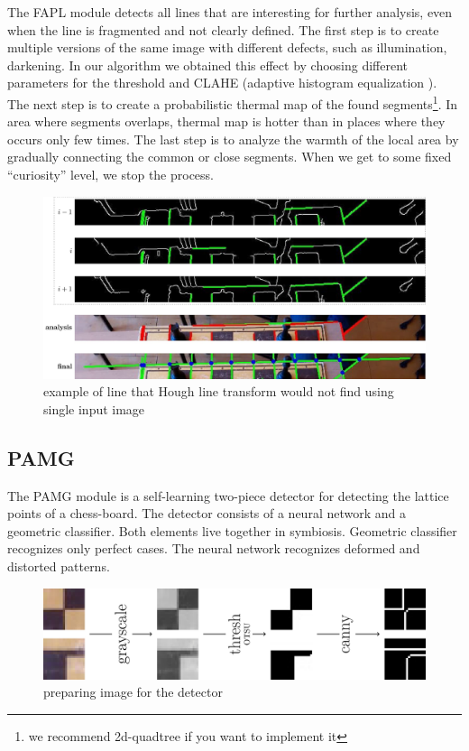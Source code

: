 \documentclass[letterpaper, 12pt]{article}
\begin{document}
The FAPL module detects all lines that are interesting for further analysis, even when the line is fragmented and not clearly defined.
The first step is to create multiple versions of the same image with different
defects, such as illumination, darkening.
In our algorithm we obtained this effect by choosing different parameters for
the threshold and CLAHE (adaptive histogram equalization
\cite{reza2004realization}).
The next step is to create a probabilistic thermal map of the found
segments\footnote{we recommend 2d-quadtree if you want to implement it}.
In area where segments overlaps, thermal map is hotter than in places where they occurs only few times.
The last step is to analyze the warmth of the local area by gradually connecting the common or close segments.
When we get to some fixed ``curiosity'' level, we stop the process.

\begin{figure}[H]
\centering
\includegraphics[width=\columnwidth]{figure5}
\caption{example of line that Hough line transform would not find using single input image}
\end{figure}

\subsection{PAMG}

The PAMG module is a self-learning two-piece detector for detecting the lattice
points of a chess-board.
The detector consists of a neural network and a geometric classifier. Both elements live together in symbiosis.
Geometric classifier recognizes only perfect cases.
The neural network recognizes deformed and distorted patterns.

\begin{figure}[H]
\centering
\includegraphics[width=\columnwidth]{figure6}
\caption{preparing image for the detector}
\end{figure}
\end{document}
